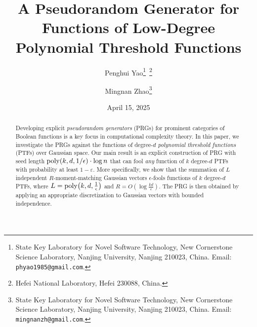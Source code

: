 \documentclass[12pt]{article}
\begin{document}
\title{A Pseudorandom Generator for Functions of Low-Degree Polynomial Threshold Functions}

\author{Penghui Yao\thanks{\scriptsize State Key Laboratory for Novel Software Technology, New Cornerstone Science Laboratory, Nanjing University, Nanjing 210023, China. Email:
    \texttt{phyao1985@gmail.com}.}~\thanks{\scriptsize Hefei National
    Laboratory, Hefei 230088, China.} \and Mingnan Zhao\thanks{\scriptsize State Key Laboratory for Novel Software Technology, New Cornerstone Science Laboratory, Nanjing University, Nanjing 210023, China. Email:
    \texttt{mingnanzh@gmail.com}.}  }
\date{April 15, 2025}
\maketitle


\thispagestyle{empty}
\begin{abstract}
  Developing explicit \emph{pseudorandom generators} (PRGs) for prominent categories of Boolean functions is a key focus in computational complexity theory.
In this paper, we investigate the PRGs against the
functions of degree-$d$
\emph{polynomial threshold functions} (PTFs)
over Gaussian space.
Our main result is an explicit construction of PRG
with seed length $\mathrm{poly}\!\left(k,d,1/\epsilon\right)\cdot\log n$
that can fool \emph{any} function of $k$
degree-$d$ PTFs with probability at least $1-\varepsilon$.
More specifically, we show that the summation of
$L$ independent $R$-moment-matching Gaussian vectors
$\epsilon$-fools functions of $k$ degree-$d$ PTFs,
where $L=\mathrm{poly}\!\left( k, d, \frac{1}{\epsilon}\right)$ and $R = O({\log \frac{kd}{\epsilon}})$.
The PRG is then obtained by applying an appropriate discretization
to Gaussian vectors with bounded independence.

 \end{abstract}




\setcounter{page}{1}
\end{document}
